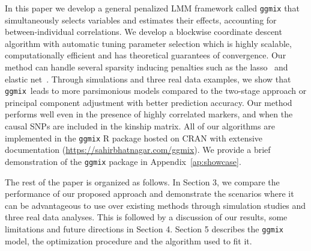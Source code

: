 \documentclass[12pt,letter]{article}\usepackage[]{graphicx}\usepackage[]{color}
\newcommand{\ggmix}{\texttt{ggmix}}
\begin{document}
In this paper we develop a general penalized LMM framework called \texttt{ggmix} that simultaneously selects variables and estimates their effects, accounting for between-individual correlations. We develop a blockwise coordinate descent algorithm with automatic tuning parameter selection which is highly scalable, computationally efficient and has theoretical guarantees of convergence. Our method can handle several sparsity inducing penalties such as the lasso~\citep{tibshirani1996regression} and elastic net~\citep{zou2005regularization}. Through simulations and three real data examples, we show that \ggmix ~leads to more parsimonious models compared to the two-stage approach or principal component adjustment with better prediction accuracy. Our method performs well even in the presence of highly correlated markers, and when the causal SNPs are included in the kinship matrix. 
All of our algorithms are implemented in the \texttt{ggmix} R package hosted on CRAN with extensive documentation (\url{https://sahirbhatnagar.com/ggmix}). We provide a brief demonstration of the \texttt{ggmix} package in Appendix~\ref{ap:showcase}.

The rest of the paper is organized as follows. In Section 3, we compare the performance of our proposed approach and demonstrate the scenarios where it can be advantageous to use over existing methods through simulation studies and three real data analyses. This is followed by a discussion of our results, some limitations and future directions in Section 4. Section 5 describes the \texttt{ggmix} model, the optimization procedure and the algorithm used to fit it.



\end{document}
